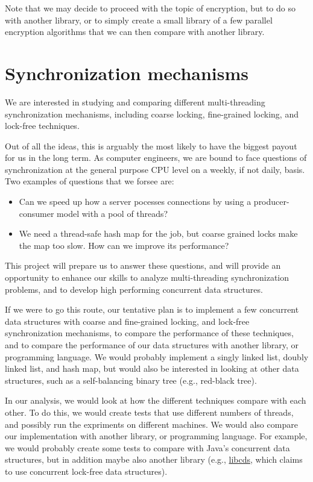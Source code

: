 \documentclass[11pt]{article} %
\begin{document}
Note that we may decide to proceed with the topic of encryption, but to do so
with another library, or to simply create a small library of a few parallel
encryption algorithms that we can then compare with another library.


\section*{Synchronization mechanisms}

We are interested in studying and comparing different multi-threading
synchronization mechanisms, including coarse locking, fine-grained locking, and
lock-free techniques.

Out of all the ideas, this is arguably the most likely to have the biggest
payout for us in the long term. As computer engineers, we are bound to face
questions of synchronization at the general purpose CPU level on a weekly, if
not daily, basis. Two examples of questions that we forsee are:

\begin{itemize}
\item
Can we speed up how a server pocesses connections by using a producer-consumer
model with a pool of threads?
\item
We need a thread-safe hash map for the job, but coarse grained locks make the
map too slow. How can we improve its performance?
\end{itemize}

This project will prepare us to answer these questions, and will provide an
opportunity to enhance our skills to analyze multi-threading synchronization
problems, and to develop high performing concurrent data structures.

If we were to go this route, our tentative plan is to implement a few concurrent
data structures with coarse and fine-grained locking, and lock-free
synchronization mechanisms, to compare the performance of these techniques, and
to compare the performance of our data structures with another library, or
programming language. We would probably implement a singly linked list, doubly
linked list, and hash map, but would also be interested in looking at other
data structures, such as a self-balancing binary tree (e.g., red-black tree).

In our analysis, we would look at how the different techniques compare with each
other. To do this, we would create tests that use different numbers of threads,
and possibly run the expriments on different machines. We would also compare our
implementation with another library, or programming language. For example, we
would probably create some tests to compare with Java's concurrent data
structures, but in addition maybe also another library (e.g.,
\href{https://github.com/khizmax/libcds}{libcds}, which claims to use concurrent
lock-free data structures).
\end{document}
